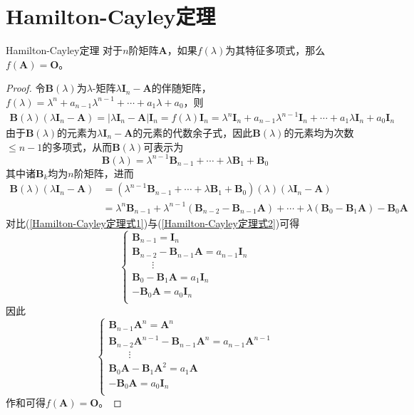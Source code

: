 \documentclass[lang = cn, scheme = chinese, thmcnt = section]{elegantbook}
\newcommand{\bs}{\boldsymbol}          %
\begin{document}
\section{Hamilton-Cayley定理}

\begin{theorem}{Hamilton-Cayley定理}
	对于$n$阶矩阵$\bs{A}$，如果$f(\lambda)$为其特征多项式，那么$f(\bs{A})=\bs{O}$。
\end{theorem}

\begin{proof}
	令$\bs{B}(\lambda)$为$\lambda$-矩阵$\lambda \bs{I}_n-\bs{A}$的伴随矩阵，$f(\lambda)=\lambda^n+a_{n-1}\lambda^{n-1}+\cdots+a_1\lambda+a_0$，则%
	\begin{gather*}\label{Hamilton-Cayley定理式1}
		\bs{B}(\lambda)(\lambda \bs{I}_n-\bs{A})
		=|\lambda \bs{I}_n-\bs{A}|\bs{I}_n
		=f(\lambda)\bs{I}_n
		=\lambda^n\bs{I}_n+a_{n-1}\lambda^{n-1}\bs{I}_n+\cdots+a_1\lambda\bs{I}_n+a_0\bs{I}_n\tag{*}
	\end{gather*}
	由于$\bs{B}(\lambda)$的元素为$\lambda \bs{I}_n-\bs{A}$的元素的代数余子式，因此$\bs{B}(\lambda)$的元素均为次数$\le n-1$的多项式，从而$\bs{B}(\lambda)$可表示为
	$$
	\bs{B}(\lambda)
	=\lambda^{n-1}\bs{B}_{n-1}+\cdots+\lambda \bs{B}_1+\bs{B}_0
	$$
	其中诸$\bs{B}_k$均为$n$阶矩阵，进而
	\begin{align*}\label{Hamilton-Cayley定理式2}
		\bs{B}(\lambda)(\lambda \bs{I}_n-\bs{A})
		& = (\lambda^{n-1}\bs{B}_{n-1}+\cdots+\lambda \bs{B}_1+\bs{B}_0)(\lambda)(\lambda \bs{I}_n-\bs{A})\\
		& = \lambda^n\bs{B}_{n-1}+\lambda^{n-1}(\bs{B}_{n-2}-\bs{B}_{n-1}\bs{A})+\cdots+\lambda(\bs{B}_0-\bs{B}_1\bs{A})-\bs{B}_0\bs{A}
		\tag{**}
	\end{align*}
	对比(\ref{Hamilton-Cayley定理式1})与(\ref{Hamilton-Cayley定理式2})可得
	$$
	\begin{cases}
		\bs{B}_{n-1}=\bs{I}_n\\
		\bs{B}_{n-2}-\bs{B}_{n-1}\bs{A}=a_{n-1}\bs{I}_{n}\\
		\qquad\vdots\\
		\bs{B}_{0}-\bs{B}_{1}\bs{A}=a_{1}\bs{I}_{n}\\
		-\bs{B}_{0}\bs{A}=a_{0}\bs{I}_{n}\\
	\end{cases}
	$$
	因此
	$$
	\begin{cases}
		\bs{B}_{n-1}\bs{A}^{n}=\bs{A}^{n}\\
		\bs{B}_{n-2}\bs{A}^{n-1}-\bs{B}_{n-1}\bs{A}^{n}=a_{n-1}\bs{A}^{n-1}\\
		\qquad\vdots\\
		\bs{B}_{0}\bs{A}-\bs{B}_{1}\bs{A}^2=a_{1}\bs{A}\\
		-\bs{B}_{0}\bs{A}=a_{0}\bs{I}_{n}\\
	\end{cases}
	$$
	作和可得$f(\bs{A})=\bs{O}$。
\end{proof}
\end{document}

